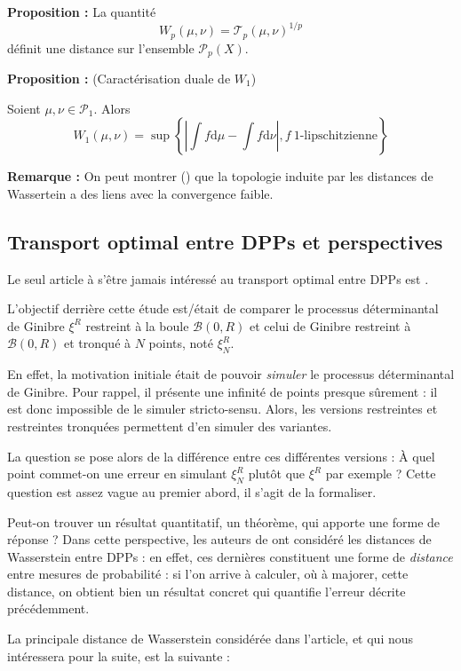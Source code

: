 \documentclass[12pt]{article}
\begin{document}
\textbf{Proposition :} La quantité $$ W_p(\mu, \nu) = \mathcal T_p(\mu, \nu)^{1/p} $$ définit une distance sur l'ensemble $ \mathcal P_p(X) $.

\textbf{Proposition :} (Caractérisation duale de $W_1$)

Soient $ \mu, \nu \in \mathcal P_1 $. Alors $$ W_1(\mu,\nu) = \sup\left\{ \left| \int f \mathrm d \mu - \int f \mathrm d \nu \right|, f \: \text{1-lipschitzienne} \right\} $$

\textbf{Remarque :} On peut montrer (\cite{ParisEst2022}) que la topologie induite par les distances de Wassertein a des liens avec la convergence faible.

\subsection{Transport optimal entre DPPs et perspectives}

Le seul article à s'être jamais intéressé au transport optimal entre DPPs est \cite{DecreusefondMoroz2021}.

L'objectif derrière cette étude est/était de comparer le processus déterminantal de Ginibre $ \xi^R $ restreint à la boule $ \mathcal B(0,R) $ et celui de Ginibre restreint à $ \mathcal B(0,R) $ et tronqué à $N$ points, noté $ \xi^R_N $.

En effet, la motivation initiale était de pouvoir \textit{simuler} le processus déterminantal de Ginibre. Pour rappel, il présente une infinité de points presque sûrement : il est donc impossible de le simuler stricto-sensu. Alors, les versions restreintes et restreintes tronquées permettent d'en simuler des variantes. 

La question se pose alors de la différence entre ces différentes versions : À quel point commet-on une erreur en simulant $ \xi^R_N $ plutôt que $ \xi^R $ par exemple ? Cette question est assez vague au premier abord, il s'agit de la formaliser.

Peut-on trouver un résultat quantitatif, un théorème, qui apporte une forme de réponse ? Dans cette perspective, les auteurs de \cite{DecreusefondMoroz2021} ont considéré les distances de Wasserstein entre DPPs : en effet, ces dernières constituent une forme de \textit{distance} entre mesures de probabilité : si l'on arrive à calculer, où à majorer, cette distance, on obtient bien un résultat concret qui quantifie l'erreur décrite précédemment.

La principale distance de Wasserstein considérée dans l'article, et qui nous intéressera pour la suite, est la suivante :
\end{document}
